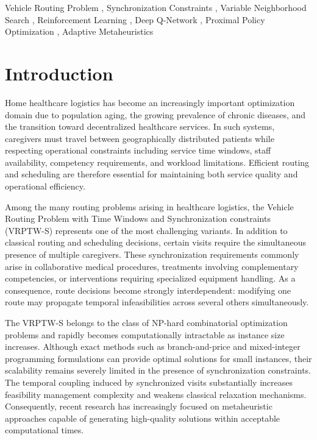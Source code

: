 \documentclass[preprint,12pt]{elsarticle}
\begin{document}
\begin{frontmatter}
\begin{keyword}
\small
Vehicle Routing Problem \sep 
Synchronization Constraints \sep 
Variable Neighborhood Search \sep 
Reinforcement Learning \sep 
Deep Q-Network \sep 
Proximal Policy Optimization \sep 
Adaptive Metaheuristics
\end{keyword}

\end{frontmatter}
\newpage

\section{Introduction}
\label{sec:intro}
Home healthcare logistics has become an increasingly important optimization domain due to population aging, the growing prevalence of chronic diseases, and the transition toward decentralized healthcare services. In such systems, caregivers must travel between geographically distributed patients while respecting operational constraints including service time windows, staff availability, competency requirements, and workload limitations. Efficient routing and scheduling are therefore essential for maintaining both service quality and operational efficiency.

Among the many routing problems arising in healthcare logistics, the Vehicle Routing Problem with Time Windows and Synchronization constraints (VRPTW-S) represents one of the most challenging variants. In addition to classical routing and scheduling decisions, certain visits require the simultaneous presence of multiple caregivers. These synchronization requirements commonly arise in collaborative medical procedures, treatments involving complementary competencies, or interventions requiring specialized equipment handling. As a consequence, route decisions become strongly interdependent: modifying one route may propagate temporal infeasibilities across several others simultaneously.

The VRPTW-S belongs to the class of NP-hard combinatorial optimization problems and rapidly becomes computationally intractable as instance size increases. Although exact methods such as branch-and-price and mixed-integer programming formulations can provide optimal solutions for small instances, their scalability remains severely limited in the presence of synchronization constraints. The temporal coupling induced by synchronized visits substantially increases feasibility management complexity and weakens classical relaxation mechanisms. Consequently, recent research has increasingly focused on metaheuristic approaches capable of generating high-quality solutions within acceptable computational times.
\end{document}
